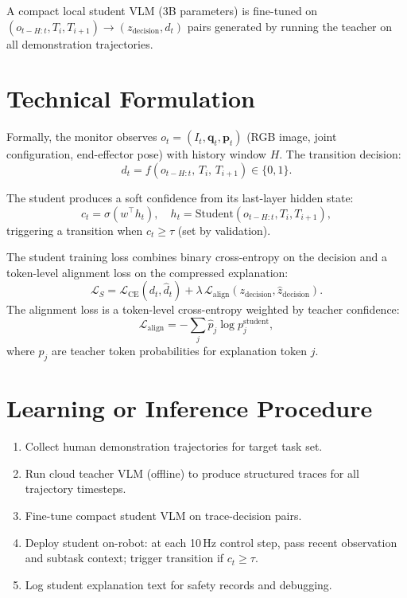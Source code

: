\documentclass[10pt,twocolumn]{article}
\begin{document}
A compact local student VLM (3B parameters) is fine-tuned on
$(o_{t-H:t}, T_i, T_{i+1}) \to (z_{\text{decision}}, d_t)$ pairs
generated by running the teacher on all demonstration trajectories.

\section{Technical Formulation}

Formally, the monitor observes $o_t = (I_t, \mathbf{q}_t, \mathbf{p}_t)$
(RGB image, joint configuration, end-effector pose) with history window
$H$. The transition decision:
\[
d_t = f(o_{t-H:t},\, T_i,\, T_{i+1}) \in \{0,1\}.
\]

The student produces a soft confidence from its last-layer hidden state:
\[
c_t = \sigma\!\left(w^\top h_t\right), \quad h_t = \text{Student}(o_{t-H:t}, T_i, T_{i+1}),
\]
triggering a transition when $c_t \geq \tau$ (set by validation).

The student training loss combines binary cross-entropy on the decision
and a token-level alignment loss on the compressed explanation:
\[
\mathcal{L}_S = \mathcal{L}_{\text{CE}}(d_t, \hat{d}_t)
              + \lambda\,\mathcal{L}_{\text{align}}(z_{\text{decision}},\hat{z}_{\text{decision}}).
\]
The alignment loss is a token-level cross-entropy weighted by teacher
confidence:
\[
\mathcal{L}_{\text{align}} = -\sum_j \hat{p}_j \log p_j^{\text{student}},
\]
where $\hat{p}_j$ are teacher token probabilities for explanation
token $j$.

\section{Learning or Inference Procedure}

\begin{enumerate}[itemsep=2pt,parsep=0pt]
  \item Collect human demonstration trajectories for target task set.
  \item Run cloud teacher VLM (offline) to produce structured
    traces for all trajectory timesteps.
  \item Fine-tune compact student VLM on trace-decision pairs.
  \item Deploy student on-robot: at each 10\,Hz control step, pass
    recent observation and subtask context; trigger transition if
    $c_t \geq \tau$.
  \item Log student explanation text for safety records and debugging.
\end{enumerate}
\end{document}
